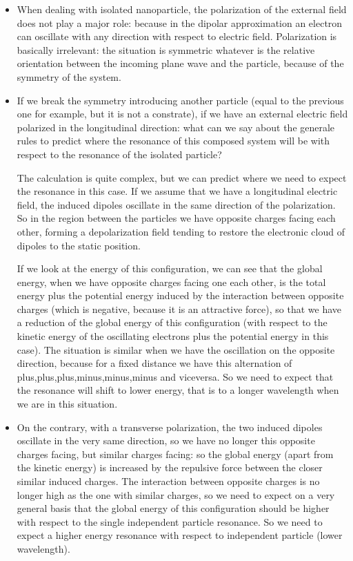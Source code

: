 \documentclass[../main/main.tex]{subfiles}
\begin{document}
\begin{itemize}
    \item When dealing with isolated nanoparticle, the polarization of the external field does not play a major role: because in the dipolar approximation an electron can oscillate with any direction with respect to electric field.
    Polarization is basically irrelevant: the situation is symmetric whatever is the relative orientation between the incoming plane wave and the particle, because of the symmetry of the system.

    \item If we break the symmetry introducing another particle (equal to the previous one for example, but it is not a constrate), if we have an external electric field polarized in the longitudinal direction: what can we say about the generale rules to predict where the resonance of this composed system will be with respect to the resonance of the isolated particle?

    The calculation is quite complex, but we can predict where we need to expect the resonance in this case.
    If we assume that we have a longitudinal electric field, the induced dipoles oscillate in the same direction of the polarization. So in the region between the particles we have opposite charges facing each other, forming a depolarization field tending to restore the electronic cloud of dipoles to the static position.

    If we look at the energy of this configuration, we can see that the global energy, when we have opposite charges facing one each other, is the total energy plus the potential energy induced by the interaction between opposite charges (which is negative, because it is an attractive force), so that we have a reduction of the global energy of this configuration (with respect to the kinetic energy of the oscillating electrons plus the potential energy in this case).
    The situation is similar when we have the oscillation on the opposite direction, because for a fixed distance we have this alternation of plus,plus,plus,minus,minus,minus and viceversa.
    So we need to expect that the resonance will shift to lower energy, that is to a longer wavelength when we are in this situation.

    \item On the contrary, with a transverse polarization, the two induced dipoles oscillate in the very same direction, so we have no longer this opposite charges facing, but similar charges facing: so the global energy (apart from the kinetic energy) is increased by the repulsive force between the closer similar induced charges.
    The interaction between opposite charges is no longer high as the one with similar charges, so we need to expect on a very general basis that the global energy of this configuration should be higher with respect to the single independent particle resonance.
    So we need to expect a higher energy resonance with respect to independent particle (lower wavelength).

\end{itemize}
\end{document}
